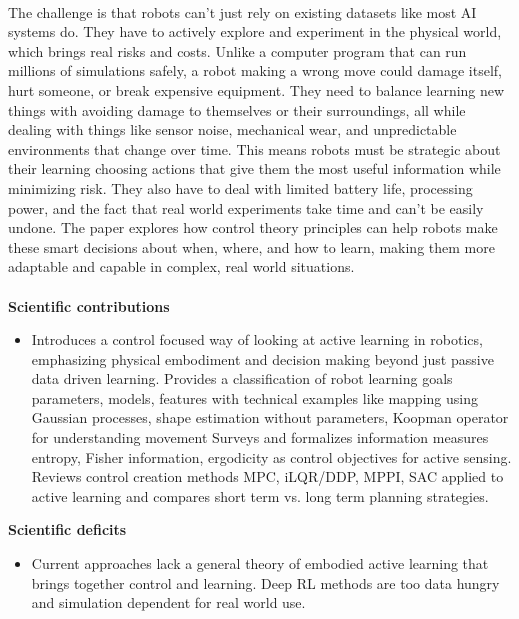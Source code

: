 \documentclass[report.tex]{subfiles}
\begin{document}
\noindent\textbf{}
\\
The challenge is that robots can't just rely on existing datasets like most AI systems do. They have to actively explore and experiment in the physical world, which brings real risks and costs. Unlike a computer program that can run millions of simulations safely, a robot making a wrong move could damage itself, hurt someone, or break expensive equipment. They need to balance learning new things with avoiding damage to themselves or their surroundings, all while dealing with things like sensor noise, mechanical wear, and unpredictable environments that change over time. This means robots must be strategic about their learning   choosing actions that give them the most useful information while minimizing risk. They also have to deal with limited battery life, processing power, and the fact that real world experiments take time and can't be easily undone. The paper explores how control theory principles can help robots make these smart decisions about when, where, and how to learn, making them more adaptable and capable in complex, real world situations.
\\\\
\noindent\textbf{Scientific contributions} 
\begin{itemize}
        \item Introduces a control focused way of looking at active learning in robotics, emphasizing physical embodiment and decision making beyond just passive data driven learning. 
         Provides a classification of robot learning goals parameters, models, features with technical examples like  mapping using Gaussian processes, shape estimation without parameters, Koopman operator for understanding movement
        Surveys and formalizes information measures entropy, Fisher information, ergodicity as control objectives for active sensing. 
        Reviews control creation methods MPC, iLQR/DDP, MPPI, SAC applied to active learning and compares short term vs. long term planning strategies.
        
\end{itemize}

\noindent\textbf{Scientific deficits} 
\begin{itemize}
        \item Current approaches lack a general theory of embodied active learning that brings together control and learning. 
        Deep RL methods are too data hungry and simulation dependent for real world use. 
        
       
\end{itemize}
\end{document}
